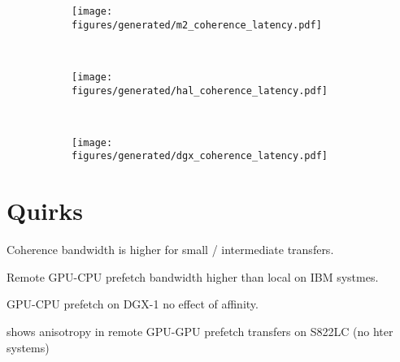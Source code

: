 \begin{figure}[ht]
	\centering
	\begin{subfigure}[b]{0.31\textwidth}
		\texttt{[image: figures/generated/m2\_coherence\_latency.pdf]}
		\caption{}
		\label{}
	\end{subfigure}
	~
	\begin{subfigure}[b]{0.31\textwidth}
		\texttt{[image: figures/generated/hal\_coherence\_latency.pdf]}
		\caption{}
		\label{}
	\end{subfigure}
	~
	\begin{subfigure}[b]{0.31\textwidth}
		\texttt{[image: figures/generated/dgx\_coherence\_latency.pdf]}
		\caption{}
		\label{}
	\end{subfigure}
	\caption[]{}
	\label{fig:coherence-page-fault-latency}
\end{figure}

\section{Quirks}

Coherence bandwidth is higher for small / intermediate transfers.

Remote GPU-CPU prefetch bandwidth higher than local on IBM systmes.

GPU-CPU prefetch on DGX-1 no effect of affinity.

shows anisotropy in remote GPU-GPU prefetch transfers on S822LC (no hter systems)